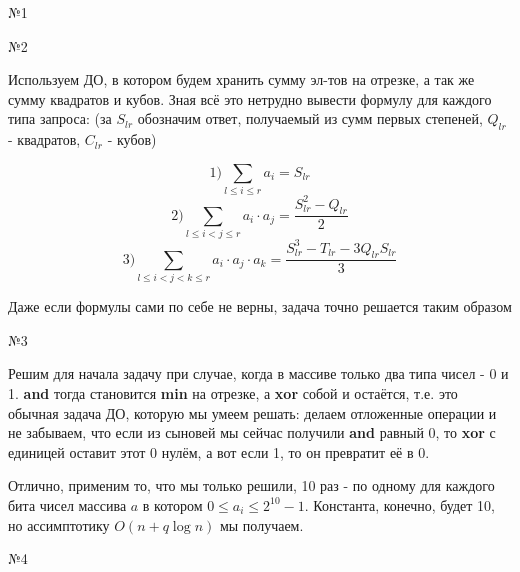 \documentclass{article}
\begin{document}
\large

\begin{center}
\huge №1
\end{center}

\begin{center}
\huge №2
\end{center}

Используем ДО, в котором будем хранить сумму эл-тов на отрезке, а так же сумму квадратов и кубов. Зная всё это нетрудно вывести формулу для каждого типа запроса: (за $S_{lr}$ обозначим ответ, получаемый из сумм первых степеней, $Q_{lr}$ - квадратов, $C_{lr}$ - кубов)

$$ 1) \sum_{l \leq i \leq r} a_i =  S_{lr} $$
$$ 2) \sum_{l \leq i < j \leq r} a_i \cdot a_j =  \frac{S_{lr}^2 - Q_{lr}}{2} $$
$$ 3) \sum_{l \leq i < j < k \leq r} a_i \cdot a_j \cdot a_k =  \frac{S_{lr}^3 - T_{lr} - 3 Q_{lr}S_{lr}}{3} $$

Даже если формулы сами по себе не верны, задача точно решается таким образом

\begin{center}
\huge №3
\end{center}

Решим для начала задачу при случае, когда в массиве только два типа чисел - 0 и 1. \textbf{and} тогда становится \textbf{min} на отрезке, а \textbf{xor} собой и остаётся, т.е. это обычная задача ДО, которую мы умеем решать: делаем отложенные операции и не забываем, что если из сыновей мы сейчас получили \textbf{and} равный 0, то \textbf{xor} с единицей оставит этот 0 нулём, а вот если 1, то он превратит её в 0.

Отлично, применим то, что мы только решили, 10 раз - по одному для каждого бита чисел массива $a$ в котором $0 \leq a_i \leq 2^{10}-1$. Константа, конечно, будет 10, но ассимптотику $O(n + q \log n)$ мы получаем.

\begin{center}
\huge №4
\end{center}
\end{document}
